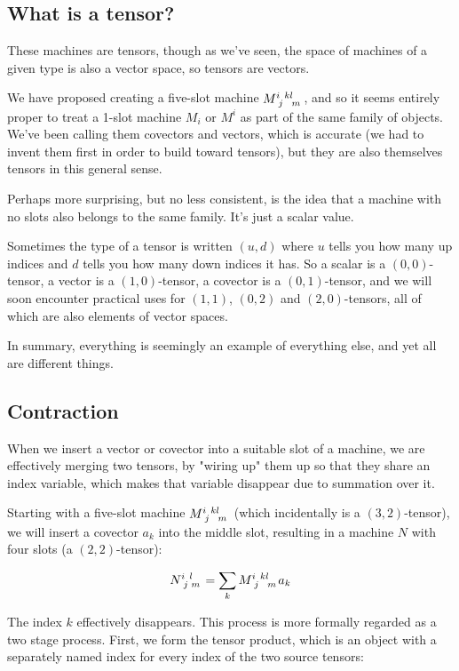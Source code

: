\subsection{What is a tensor?}

These machines are tensors, though as we've seen, the space of machines of a given type is also a vector space, so tensors are vectors.

We have proposed creating a five-slot machine $M\indices{^i_j^k^l_m}$, and so it seems entirely proper to treat a 1-slot machine $M_i$ or $M^i$ as part of the same family of objects. We've been calling them covectors and vectors, which is accurate (we had to invent them first in order to build toward tensors), but they are also themselves tensors in this general sense.

Perhaps more surprising, but no less consistent, is the idea that a machine with no slots also belongs to the same family. It's just a scalar value.

Sometimes the type of a tensor is written $(u, d)$ where $u$ tells you how many up indices and $d$ tells you how many down indices it has. So a scalar is a $(0, 0)$-tensor, a vector is a $(1, 0)$-tensor, a covector is a $(0, 1)$-tensor, and we will soon encounter practical uses for $(1, 1)$, $(0, 2)$ and $(2, 0)$-tensors, all of which are also elements of vector spaces.

In summary, everything is seemingly an example of everything else, and yet all are different things.

\subsection{Contraction} \label{tensor-contraction}

When we insert a vector or covector into a suitable slot of a machine, we are effectively merging two tensors, by "wiring up" them up so that they share an index variable, which makes that variable disappear due to summation over it.

Starting with a five-slot machine $M\indices{^i_j^k^l_m}$ (which incidentally is a $(3,2)$-tensor), we will insert a covector $a_k$ into the middle slot, resulting in a machine $N$ with four slots (a $(2,2)$-tensor):

$$
N\indices{^i_j^l_m} = \sum_{k} M\indices{^i_j^k^l_m} a_k
$$

The index $k$ effectively disappears. This process is more formally regarded as a two stage process. First, we form the tensor product, which is an object with a separately named index for every index of the two source tensors:

